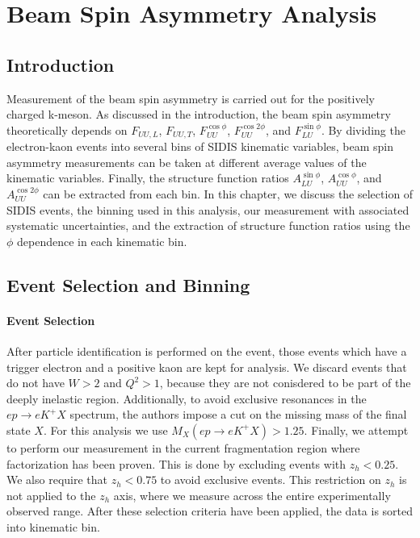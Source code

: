 \chapter{Beam Spin Asymmetry Analysis}

\section{Introduction}
Measurement of the beam spin asymmetry is carried out for the positively charged k-meson.  As discussed in the introduction, the beam spin asymmetry theoretically depends on $F_{UU,L}$, $F_{UU,T}$, $F_{UU}^{\cos\phi}$, $F_{UU}^{\cos 2\phi}$, and $F_{LU}^{\sin\phi}$.  By dividing the electron-kaon events into several bins of SIDIS kinematic variables, beam spin asymmetry measurements can be taken at different average values of the kinematic variables.  Finally, the structure function ratios $A_{LU}^{\sin\phi}$, $A_{UU}^{\cos\phi}$, and $A_{UU}^{\cos 2\phi}$ can be extracted from each bin.  In this chapter, we discuss the selection of SIDIS events, the binning used in this analysis, our measurement with associated systematic uncertainties, and the extraction of structure function ratios using the $\phi$ dependence in each kinematic bin.

\section{Event Selection and Binning}
\subsubsection*{Event Selection}
After particle identification is performed on the event, those events which have a trigger electron and a positive kaon are kept for analysis.  We discard events that do not have $W > 2$ and $Q^2 > 1$, because they are not conisdered to be part of the deeply inelastic region.  Additionally, to avoid exclusive resonances in the $ep \rightarrow eK^+X$ spectrum, the authors impose a cut on the missing mass of the final state $X$.  For this analysis we use $M_{X} (ep \rightarrow eK^+X) > 1.25$.  Finally, we attempt to perform our measurement in the current fragmentation region where factorization has been proven.  This is done by excluding events with $z_h < 0.25$.  We also require that $z_h < 0.75$ to avoid exclusive events.  This restriction on $z_h$ is not applied to the $z_h$ axis, where we measure across the entire experimentally observed range.  After these selection criteria have been applied, the data is sorted into kinematic bin.

